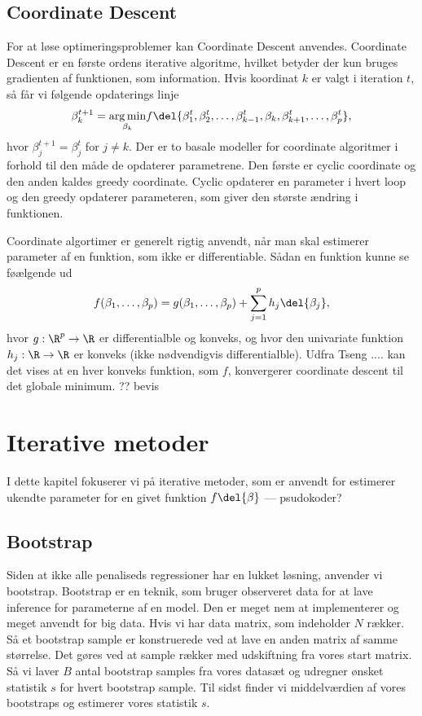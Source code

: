 \section{Coordinate Descent}
For at løse optimeringsproblemer kan Coordinate Descent anvendes. 
Coordinate Descent er en første ordens iterative algoritme, hvilket betyder der kun bruges gradienten af funktionen, som information. 
Hvis koordinat $k$ er valgt i iteration $t$, så får vi følgende opdaterings linje
\begin{align*}
\beta_k^{t+1} =\underset{ \beta_k}{\arg \min}  f\del{ \beta_1^t, \beta_2^t, \dots, \beta_{k-1}^t, \beta_k, \beta_{k+1}^t, \dots, \beta_p^t  },
\end{align*}
hvor $\beta_j^{t+1} = \beta_j^t$ for $j \neq k$. 
Der er to basale modeller for coordinate algoritmer i forhold til den måde de opdaterer parametrene. Den første er cyclic coordinate og den anden kaldes greedy coordinate. 
Cyclic opdaterer en parameter i hvert loop og den greedy opdaterer parameteren, som giver den største ændring i funktionen. 

Coordinate algortimer er generelt rigtig anvendt, når man skal estimerer parameter af en funktion, som ikke er differentiable. Sådan en funktion kunne se føælgende ud
\begin{align*}
f(\beta_1, \dots, \beta_p) = g(\beta_1, \dots, \beta_p) + \sum_{j = 1}^p h_j \del{\beta_j},
\end{align*}
hvor $g: \R^p \rightarrow \R $ er differentialble og konveks, og hvor den univariate funktion $h_j : \R \rightarrow \R$ er konveks (ikke nødvendigvis differentialble). Udfra Tseng .... kan det vises at en hver konveks funktion, som $f$, konvergerer coordinate descent til det globale minimum. 
?? bevis
 

\chapter{Iterative metoder}
I dette kapitel fokuserer vi på iterative metoder, som er anvendt for estimerer ukendte parameter for en givet funktion $f \del{\beta}$
--- psudokoder? 

\section{Bootstrap}
Siden at ikke alle penaliseds regressioner har en lukket løsning, anvender vi bootstrap. 
Bootstrap er en teknik, som bruger observeret data for at lave inference for parameterne af en model. Den er meget nem at implementerer og meget anvendt for big data. 
Hvis vi har data matrix, som indeholder $N$ rækker. Så et bootstrap sample er konstruerede ved at lave en anden matrix af samme størrelse. Det gøres ved at sample rækker med udskiftning fra vores start matrix. 
Så vi laver $B$ antal bootstrap samples fra vores datasæt og udregner ønsket statistik $s$ for hvert bootstrap sample. Til sidst finder vi middelværdien af vores bootstraps og estimerer vores statistik $s$.

